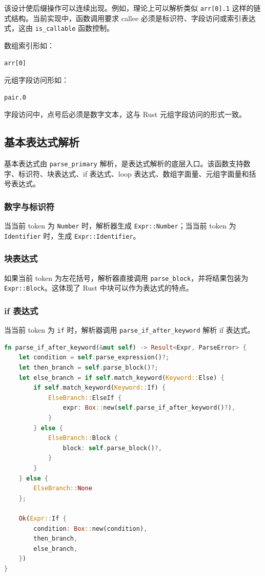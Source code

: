 \documentclass[UTF8,a4paper,12pt]{ctexart}
\begin{document}
该设计使后缀操作可以连续出现。例如，理论上可以解析类似 \texttt{arr[0].1} 这样的链式结构。当前实现中，函数调用要求 callee 必须是标识符、字段访问或索引表达式，这由 \texttt{is\_callable} 函数控制。

数组索引形如：

\begin{lstlisting}[caption={数组索引示例}]
arr[0]
\end{lstlisting}

元组字段访问形如：

\begin{lstlisting}[caption={元组字段访问示例}]
pair.0
\end{lstlisting}

字段访问中，点号后必须是数字文本，这与 Rust 元组字段访问的形式一致。

\subsection{基本表达式解析}

基本表达式由 \texttt{parse\_primary} 解析，是表达式解析的底层入口。该函数支持数字、标识符、块表达式、if 表达式、loop 表达式、数组字面量、元组字面量和括号表达式。

\subsubsection{数字与标识符}

当当前 token 为 \texttt{Number} 时，解析器生成 \texttt{Expr::Number}；当当前 token 为 \texttt{Identifier} 时，生成 \texttt{Expr::Identifier}。

\subsubsection{块表达式}

如果当前 token 为左花括号，解析器直接调用 \texttt{parse\_block}，并将结果包装为 \texttt{Expr::Block}。这体现了 Rust 中块可以作为表达式的特点。

\subsubsection{if 表达式}

当当前 token 为 \texttt{if} 时，解析器调用 \texttt{parse\_if\_after\_keyword} 解析 if 表达式。

\begin{lstlisting}[language=Rust,caption={if 表达式解析函数}]
fn parse_if_after_keyword(&mut self) -> Result<Expr, ParseError> {
    let condition = self.parse_expression()?;
    let then_branch = self.parse_block()?;
    let else_branch = if self.match_keyword(Keyword::Else) {
        if self.match_keyword(Keyword::If) {
            ElseBranch::ElseIf {
                expr: Box::new(self.parse_if_after_keyword()?),
            }
        } else {
            ElseBranch::Block {
                block: self.parse_block()?,
            }
        }
    } else {
        ElseBranch::None
    };

    Ok(Expr::If {
        condition: Box::new(condition),
        then_branch,
        else_branch,
    })
}
\end{lstlisting}
\end{document}

